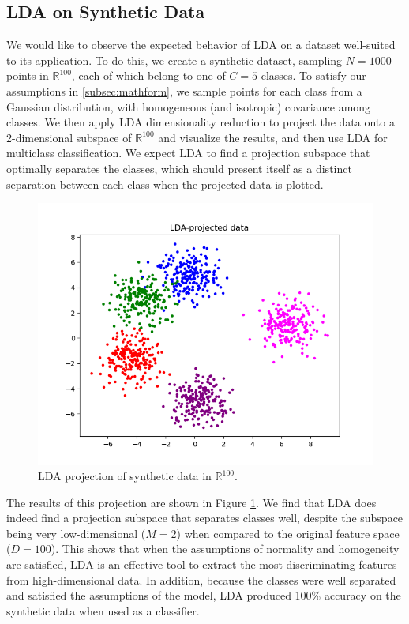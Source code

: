 \documentclass[letterpaper, 10 pt, conference]{ieeeconf}  %
\begin{document}
\subsection{LDA on Synthetic Data}
We would like to observe the expected behavior of LDA on a dataset well-suited to its application.
To do this, we create a synthetic dataset, sampling $N=1000$ points in $\mathbb{R}^{100}$, each of which belong to one of $C=5$ classes.
To satisfy our assumptions in \ref{subsec:mathform}, we sample points for each class from a Gaussian distribution, with homogeneous (and isotropic) covariance among classes.
We then apply LDA dimensionality reduction to project the data onto a 2-dimensional subspace of $\mathbb{R}^{100}$ and visualize the results, and then use LDA for multiclass classification. 
We expect LDA to find a projection subspace that optimally separates the classes, which should present itself as a distinct separation between each class when the projected data is plotted.

\begin{figure}[h]
    \centering
    \includegraphics[width=\columnwidth]{figs/synthetic_projection.png}
    \caption{LDA projection of synthetic data in $\mathbb{R}^{100}$.}
    \label{fig:synthetic_projection}
\end{figure}

The results of this projection are shown in Figure \ref{fig:synthetic_projection}.
We find that LDA does indeed find a projection subspace that separates classes well, despite the subspace being very low-dimensional ($M=2$) when compared to the original feature space ($D=100$). 
This shows that when the assumptions of normality and homogeneity are satisfied, LDA is an effective tool to extract the most discriminating features from high-dimensional data.
In addition,
because the classes were well separated and satisfied the assumptions of the model, LDA produced 100\% accuracy on the synthetic data when used as a classifier.
\end{document}
